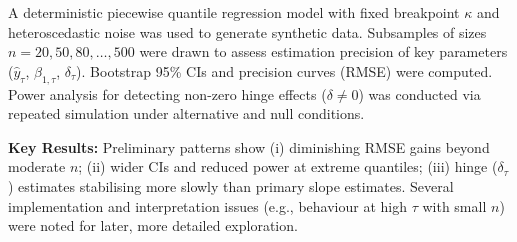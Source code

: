 \begin{enumerate}
A deterministic piecewise quantile regression model with fixed breakpoint \(\kappa\) and heteroscedastic noise was used to generate synthetic data. Subsamples of sizes \(n=20,50,80,\dots,500\) were drawn to assess estimation precision of key parameters (\(\hat y_{\tau}\), \(\beta_{1,\tau}\), \(\delta_{\tau}\)). Bootstrap 95\% CIs and precision curves (RMSE) were computed. Power analysis for detecting non-zero hinge effects (\(\delta\neq 0\)) was conducted via repeated simulation under alternative and null conditions.

\textbf{Key Results:} Preliminary patterns show (i) diminishing RMSE gains beyond moderate \(n\); (ii) wider CIs and reduced power at extreme quantiles; (iii) hinge (\(\delta_{\tau}\)) estimates stabilising more slowly than primary slope estimates. Several implementation and interpretation issues (e.g., behaviour at high \(\tau\) with small \(n\)) were noted for later, more detailed exploration.


\end{enumerate}
